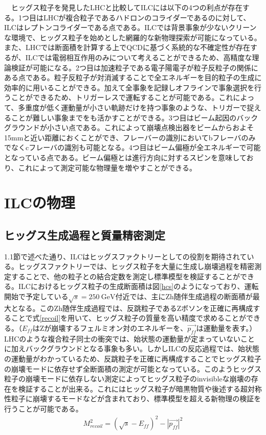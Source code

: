 　ヒッグス粒子を発見したLHCと比較してILCには以下の4つの利点が存在する。1つ目はLHCが複合粒子であるハドロンのコライダーであるのに対して、ILCはレプトンコライダーである点である。ILCでは背景事象が少ないクリーンな環境で、ヒッグス粒子を始めとした網羅的な新物理探索が可能になっている。また、LHCでは断面積を計算する上でQCDに基づく系統的な不確定性が存在するが、ILCでは電弱相互作用のみについて考えることができるため、高精度な理論検証が可能になる。2つ目は加速粒子である電子陽電子が粒子反粒子の関係にある点である。粒子反粒子が対消滅することで全エネルギーを目的粒子の生成に効率的に用いることができる。加えて全事象を記録しオフラインで事象選択を行うことができるため、トリガーレスで運転することが可能である。これによって、多重度が低く運動量が小さい軌跡だけを持つ事象のような、トリガーで捉えることが難しい事象までをも活かすことができる。3つ目はビーム起因のバックグラウンドが小さい点である。これによって崩壊点検出器をビームからおよそ15mmと近い距離におくことができ、フレーバーの識別においてbフレーバのみでなくcフレーバの識別も可能となる。4つ目はビーム偏極が全エネルギーで可能となっている点である。ビーム偏極とは進行方向に対するスピンを意味しており、これによって測定可能な物理量を増やすことができる。
\section{ILCの物理}
\subsection{ヒッグス生成過程と質量精密測定}
1.1節で述べた通り、ILCはヒッグスファクトリーとしての役割を期待されている。ヒッグスファクトリーでは、ヒッグス粒子を大量に生成し崩壊過程を精密測定することで、他の粒子との結合定数を測定し標準模型を検証することができる。ILCにおけるヒッグス粒子の生成断面積は図\ref{hcs}のようになっており、運転開始で予定している$\sqrt{s}=250\ \mathrm{GeV}$付近では、主にZh随伴生成過程の断面積が最大となる。このZh随伴生成過程では、反跳粒子であるZボソンを正確に再構成することで式\ref{recoil}を用いて、ヒッグス粒子の質量を高い精度で求めることができる。（$E_{ff}$はZが崩壊するフェルミオン対のエネルギーを、$\vec{p_{ff}}$は運動量を表す。）\\
LHCのような複合粒子同士の衝突では、始状態の運動量が定まっていないことに加えバックグラウンドとなる事象も多い。しかしILCの反応過程では、始状態の運動量がわかっているため、反跳粒子を正確に再構成することでヒッグス粒子の崩壊モードに依存せず全断面積の測定が可能となっている。このようヒッグス粒子の崩壊モードに依存しない測定によってヒッグス粒子のinvisibleな崩壊の存在を検証することが出来る。これにはヒッグス粒子が暗黒物質や後述する超対称性粒子に崩壊するモードなどが含まれており、標準模型を超える新物理の検証を行うことが可能である。
\begin{align}
\label{recoil}
M_{recoil}^2 = {( \sqrt{s} - E_{ff} )}^2 - {|\vec{p_{ff}}|}^2
\end{align}

